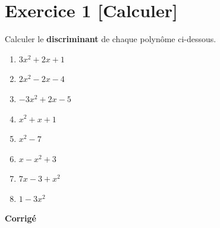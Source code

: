 \documentclass{article}
\begin{document}
\section*{Exercice 1 \textbf{[Calculer]}}

Calculer le \textbf{discriminant} de chaque polynôme ci-dessous.
\begin{enumerate}
    \item $3x^2 + 2x + 1$
    \item $2x^2 - 2x - 4$
    \item $-3x^2 + 2x - 5$
    \item $x^2 + x + 1$
    \item $x^2 - 7$
    \item $x - x^2 + 3$
    \item $7x - 3 + x^2$
    \item $1 - 3x^2$
\end{enumerate}

\textbf{Corrigé}
\end{document}

